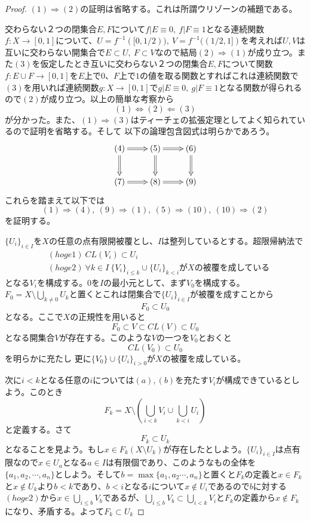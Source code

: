 \documentclass[leqno]{jsarticle}
\newcommand{\To}{\Longrightarrow}
\newcommand{\Gets}{\Longleftarrow}
\begin{document}
\begin{proof}
$(1)\To (2)$の証明は省略する。これは所謂ウリゾーンの補題である。\par
交わらない２つの閉集合$E,F$について$f|E\equiv 0,\ f|F\equiv 1$となる連続関数$f:X\to [0,1]$について、$U=f^{-1}([0,1/2)),\ V=f^{-1}((1/2,1])$を考えれば$U,V$は互いに交わらない開集合で$E\subset U,\ F\subset V$なので結局$(2)\To (1)$が成り立つ。また$(3)$を仮定したとき互いに交わらない２つの閉集合$E,F$について関数$f:E\cup F\to [0,1]$を$E$上で$0$、$F$上で$1$の値を取る関数とすればこれは連続関数で$(3)$を用いれば連続関数$g:X\to [0,1]$で$g|E\equiv 0,\ g|F\equiv 1$となる関数が得られるので$(2)$が成り立つ。以上の簡単な考察から
\[
(1)\iff (2)\Gets (3)
\]
が分かった。また、$(1)\To (3)$はティーチェの拡張定理としてよく知られているので証明を省略する。そして
以下の論理包含図式は明らかであろう。
\[\xymatrix{
& (4) \ar@{=>}[r]\ar@{=>}[d]& (5)\ar@{=>}[r]\ar@{=>}[d] & (6)\ar@{=>}[d] &\\ 
& (7)\ar@{=>}[r] & (8) \ar@{=>}[r]& (9) & 
}\]
これらを踏まえて以下では
\[
(1)\To (4),\ (9)\To (1),\ (5)\To(10),\ (10)\To (2)
\]
を証明する。\par
[$(1)\To(4)$の証明]\par
$\{U_{i}\}_{i\in I}$を$X$の任意の点有限開被覆とし、$I$は整列しているとする。超限帰納法で
\begin{align*}
&(hoge1)\ CL(V_i)\subset U_i\\ 
&(hoge2)\ \forall k\in I\ \{V_{i}\}_{i\le k}\cup\{U_i\}_{k<i}\mbox{が$X$の被覆を成している}
\end{align*}
となる$V_i$を構成する。$0$を$I$の最小元として、まず$V_0$を構成する。$F_0=X\setminus \bigcup_{k\neq0}U_k$と置くとこれは閉集合で$\{U_i\}_{i\in I}$が被覆を成すことから
\[
F_0\subset U_0
\]
となる。ここで$X$の正規性を用いると
\[
F_0\subset V\subset CL(V)\subset U_0
\]
となる開集合$V$が存在する。このような$V$の一つを$V_0$とおくと
\[
CL(V_0)\subset U_0
\]
を明らかに充たし
更に$\{V_0\}\cup\{U_i\}_{i>0}$が$X$の被覆を成している。\par
次に$i<k$となる任意の$i$については$(a),(b)$を充たす$V_i$が構成できているとしよう。このとき
\[
F_k=X\setminus \left(\bigcup_{i<k}V_i\cup \bigcup_{k<i}U_i\right)
\]
と定義する。さて
\[
F_k\subset U_k
\]
となることを見よう。もし$x\in F_k(X\setminus U_k)$が存在したとしよう。$\{U_i\}_{i\in I}$は点有限なので$x\in U_{a}$となる$a\in I$は有限個であり、このようなもの全体を$\{a_1,a_2,\cdots,a_n\}$としよう。そして$b=\max\{a_1,a_2\cdots ,a_n\}$と置くと$F_k$の定義と$x\in F_k$と$x\not\in U_k$より$b<k$であり、$b<i$となる$i$について$x\not\in U_i$であるので$b$に対する$(hoge2)$から$x\in \bigcup_{i\le b}V_b$であるが、$\bigcup_{i\le b}V_b\subset \bigcup_{i<k}V_i$と$F_k$の定義から$x\not\in F_k$になり、矛盾する。よって$F_k\subset U_k$\par

\end{proof}
\end{document}
